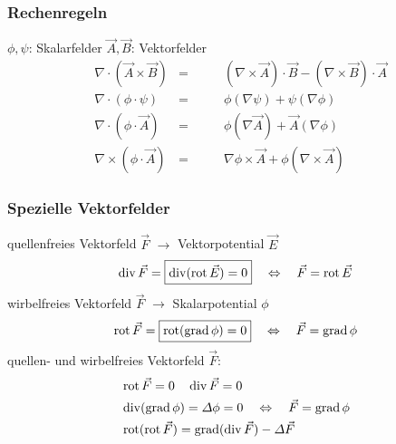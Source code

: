 \subsubsection{Rechenregeln}
$\phi, \psi$: Skalarfelder \qquad $\vec{A}, \vec{B}$: Vektorfelder
\begin{align*}
     & \nabla \cdot (\vec{A} \times \vec{B}) & = & \qquad (\nabla \times \vec{A})\cdot\vec{B} - (\nabla\times\vec{B})\cdot\vec{A} \\
     & \nabla \cdot (\phi \cdot \psi)        & = & \qquad \phi (\nabla \psi) + \psi( \nabla \phi)                                  \\
     & \nabla \cdot (\phi \cdot \vec{A})           & = & \qquad \phi (\nabla \vec{A}) + \vec{A}(\nabla \phi)                             \\
     & \nabla \times (\phi \cdot \vec{A})          & = & \qquad \nabla \phi \times \vec{A} + \phi (\nabla \times \vec{A})                        
\end{align*}

\subsubsection{Spezielle Vektorfelder}
quellenfreies Vektorfeld $\vec{F}$ $\rightarrow$ Vektorpotential $\vec{E}$
\begin{align*}
\operatorname{div} \vec{F} = \boxed{\operatorname{div} (\operatorname{rot} \vec{E}) = 0} \quad \Leftrightarrow \quad  \vec{F} = \operatorname{rot} \vec{E}
\end{align*}
wirbelfreies Vektorfeld $\vec{F}$ $\rightarrow$ Skalarpotential $\phi$
\begin{align*}
    \operatorname{rot} \vec{F} = \boxed{\operatorname{rot} (\operatorname{grad} \phi) = 0} \quad \Leftrightarrow \quad  \vec{F} = \operatorname{grad} \phi
\end{align*}
quellen- und wirbelfreies Vektorfeld $\vec{F}$:
\begin{align*}
    &\operatorname{rot} \vec{F}  = 0 \quad \operatorname{div} \vec{F} = 0\\
    &\operatorname{div} (\operatorname{grad} \phi) = \varDelta \phi = 0 \quad \Leftrightarrow \quad  \vec{F} = \operatorname{grad} \phi\\
    &\operatorname{rot} (\operatorname{rot} \vec{F})  = \operatorname{grad} (\operatorname{div} \vec{F}) - \varDelta \vec{F} 
\end{align*}

